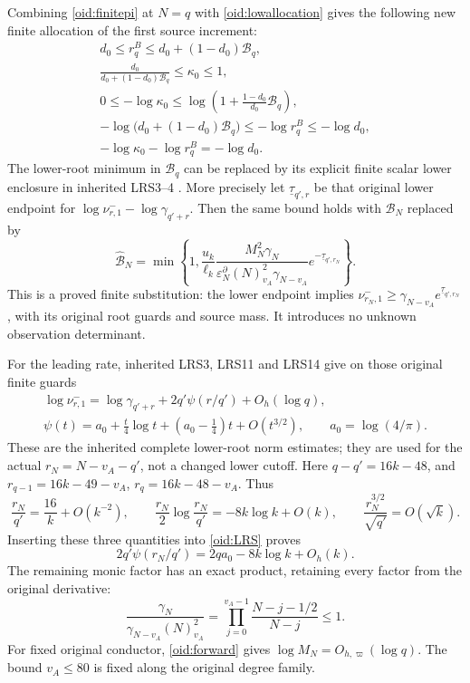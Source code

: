 \documentclass[11pt,a4paper]{article}
\begin{document}
Combining \eqref{oid:finitepi} at $N=q$ with
\eqref{oid:lowallocation} gives the following new finite allocation
of the first source increment:
\begin{equation}\label{oid:finiteallocation}
 \boxed{\begin{gathered}
 d_0\le r_q^B\le d_0+(1-d_0)\mathcal B_q,\\
 \frac{d_0}{d_0+(1-d_0)\mathcal B_q}\le\kappa_0\le1,\\
 0\le-\log\kappa_0
 \le\log\left(1+\frac{1-d_0}{d_0}\mathcal B_q\right),\\
 -\log\bigl(d_0+(1-d_0)\mathcal B_q\bigr)
 \le-\log r_q^B\le-\log d_0,\\
 -\log\kappa_0-\log r_q^B=-\log d_0.
 \end{gathered}}
\end{equation}
The lower-root minimum in $\mathcal B_q$ can be replaced by its
explicit finite scalar lower enclosure in inherited LRS3--4
\cite{InheritedLRS}. More precisely let
$\underline\tau_{q',r}$ be that original lower endpoint for
$\log\nu^-_{r,1}-\log\gamma_{q'+r}$. Then the same bound holds
with $\mathcal B_N$ replaced by
\begin{equation}\label{oid:evaluatedfinitepi}
 \widehat{\mathcal B}_N=
 \min\left\{1,\frac{u_k}{\ell_k}
 \frac{M_N^2\gamma_N}
 {\varepsilon_N^\partial(N)_{v_A}^2\gamma_{N-v_A}}
 e^{-\underline\tau_{q',r_N}}\right\}.
\end{equation}
This is a proved finite substitution: the lower endpoint implies
$\nu^-_{r_N,1}\ge\gamma_{N-v_A}
e^{\underline\tau_{q',r_N}}$, with its original root guards and
source mass. It introduces no unknown observation determinant.

For the leading rate, inherited LRS3, LRS11 and LRS14
\cite{InheritedLRS} give on those original finite guards
\begin{equation}\label{oid:LRS}
 \begin{gathered}
 \log\nu^-_{r,1}=\log\gamma_{q'+r}+2q'\psi(r/q')+O_h(\log q),\\
 \psi(t)=a_0+\frac t4\log t+(a_0-\tfrac14)t+O(t^{3/2}),
 \qquad a_0=\log(4/\pi).
 \end{gathered}
\end{equation}
These are the inherited complete lower-root norm estimates; they
are used for the actual $r_N=N-v_A-q'$, not a changed lower cutoff.
Here $q-q'=16k-48$, and
$r_{q-1}=16k-49-v_A$, $r_q=16k-48-v_A$. Thus
\[
 \frac{r_N}{q'}=\frac{16}{k}+O(k^{-2}),\qquad
 \frac{r_N}{2}\log\frac{r_N}{q'}=-8k\log k+O(k),\qquad
 \frac{r_N^{3/2}}{\sqrt{q'}}=O(\sqrt k).
\]
Inserting these three quantities into \eqref{oid:LRS} proves
\begin{equation}\label{oid:profile}
 2q'\psi(r_N/q')=2qa_0-8k\log k+O_h(k).
\end{equation}
The remaining monic factor has an exact product, retaining every
factor from the original derivative:
\[
 \frac{\gamma_N}{\gamma_{N-v_A}(N)_{v_A}^2}
 =\prod_{j=0}^{v_A-1}\frac{N-j-1/2}{N-j}\le1.
\]
For fixed original conductor, \eqref{oid:forward} gives
$\log M_N=O_{h,\varpi}(\log q)$. The bound $v_A\le80$
is fixed along the original degree family.
\end{document}
